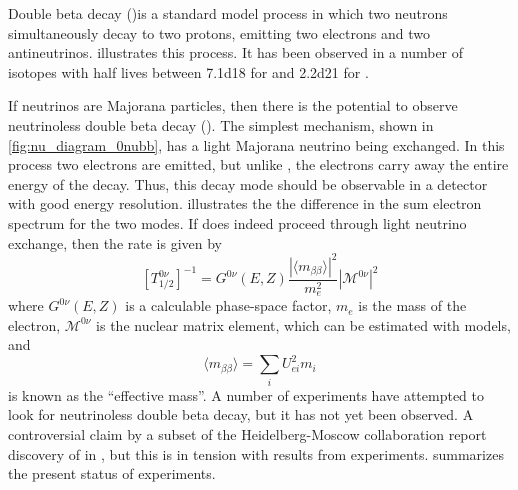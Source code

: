 \documentclass[herrin-thesis.tex]{subfiles}
\begin{document}
Double beta decay (\twonu{})is a standard model process in which two neutrons simultaneously decay to two protons, emitting two electrons and two antineutrinos.  illustrates this process. It has been observed in a number of isotopes with half lives between \SI{7.1d18}{\year} for \cite{Arnold:2005hc} and \SI{2.2d21}{\year} for \cite{Auger:2012ar}.

If neutrinos are Majorana particles, then there is the potential to observe neutrinoless double beta decay (\zeronu{}). The simplest mechanism, shown in \cref{fig:nu_diagram_0nubb}, has a light Majorana neutrino being exchanged. In this process two electrons are emitted, but unlike \twonu{}, the electrons carry away the entire energy of the decay. Thus, this decay mode should be observable in a detector with good energy resolution.  illustrates the the difference in the sum electron spectrum for the two modes. If \zeronu{} does indeed proceed through light neutrino exchange, then the rate is given by
\begin{equation}
\left [ T^{0\nu}_{1/2} \right ]^{-1} = G^{0\nu}\left(E, Z\right)\frac{\left | \langle m_{\beta\beta} \rangle \right |^2}{m_e^2}\left | \mathcal{M}^{0\nu}\right |^2
\label{eq:nu_zeronu_rate}
\end{equation}
where \(G^{0\nu}(E,Z)\) is a calculable phase-space factor, \(m_e\) is the mass of the electron, \( \mathcal{M}^{0\nu}\) is the nuclear matrix element, which can be estimated with models, and
\begin{equation}
\langle m_{\beta\beta} \rangle = \sum_i U_{e i}^2 m_i
\label{eq:nu_meff_def}
\end{equation}
is known as the ``effective mass''. A number of experiments have attempted to look for neutrinoless double beta decay, but it has not yet been observed. A controversial claim by a subset of the Heidelberg-Moscow collaboration report discovery of \zeronu{} in \cite{KlapdorKleingrothaus:2006ff}, but this is in tension with results from  experiments\cite{Auger:2012ar}\cite{Gando:2013fk}.  summarizes the present status of experiments.
\end{document}
